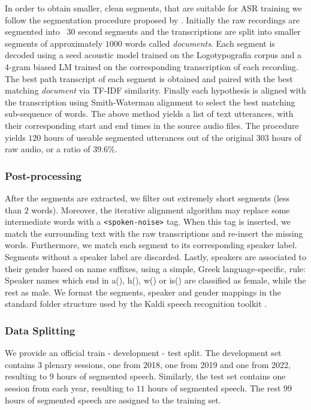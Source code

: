 \documentclass[journal]{IEEEtran}
\begin{document}
In order to obtain smaller, clean segments, that are suitable for ASR training we follow the segmentation procedure proposed by \cite{8268956}. Initially the raw recordings are segmented into ~$30$ second segments and the transcriptions are split into smaller segments of approximately $1000$ words called \emph{documents}.
Each segment is decoded using a seed acoustic model trained on the Logotypografia corpus \cite{digalakis03_eurospeech} and a 4-gram biased LM trained on the corresponding transcription of each recording.
The best path transcript of each segment is obtained and paired with the best matching \emph{document} via TF-IDF similarity. Finally each hypothesis is aligned with the transcription using Smith-Waterman alignment \cite{SMITH1981195} to select the best matching sub-sequence of words. The above method yields a list of text utterances, with their corresponding start and end times in the source audio files. The procedure yields $120$ hours of useable segmented utterances out of the original $303$ hours of raw audio, or a ratio of $39.6\%$.

\subsubsection{Post-processing} After the segments are extracted, we filter out extremely short segments (less than $2$ words). Moreover, the iterative alignment algorithm may replace some intermediate words with a \texttt{<spoken-noise>} tag. When this tag is inserted, we match the surrounding text with the raw transcriptions and re-insert the missing words. Furthermore, we match each segment to its corresponding speaker label. Segments without a speaker label are discarded. Lastly, speakers are associated to their gender based on name suffixes, using a simple, Greek language-specific, rule: Speaker names which end in a(\textalpha), h(\texteta), w(\textomega) or is(\textiota\textvarsigma) are classified as female, while the rest as male. We format the segments, speaker and gender mappings in the standard folder structure used by the Kaldi speech recognition toolkit \cite{Povey_ASRU2011}.

\subsubsection{Data Splitting} We provide an official train - development - test split. The development set contains $3$ plenary sessions, one from 2018, one from 2019 and one from 2022, resulting to $9$ hours of segmented speech. Similarly, the test set contains one session from each year, resulting to $11$ hours of segmented speech. The rest $99$ hours of segmented speech are assigned to the training set.
\end{document}
